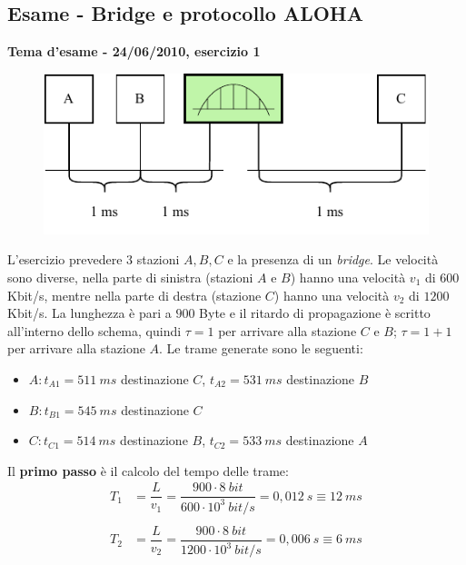 \documentclass[a4paper]{article}
\begin{document}
	\subsection{\textcolor{Red3}{Esame - Bridge e protocollo ALOHA}}
	
	\begin{center}
		\large
		\textcolor{Green4}{\textbf{Tema d'esame - 24/06/2010, esercizio 1}}
	\end{center}
	\begin{figure}[!htp]
		\centering
		\includegraphics[width=.7\textwidth]{img/ex2_bridge-ALOHA.pdf}
	\end{figure}

	\noindent
	L'esercizio prevedere $3$ stazioni $A,B,C$ e la presenza di un \emph{bridge}. Le velocità sono diverse, nella parte di sinistra (stazioni $A$ e $B$) hanno una velocità $v_{1}$ di $600$ Kbit/s, mentre nella parte di destra (stazione $C$) hanno una velocità $v_{2}$ di $1200$ Kbit/s. La lunghezza è pari a $900$ Byte e il ritardo di propagazione è scritto all'interno dello schema, quindi $\tau = 1$ per arrivare alla stazione $C$ e $B$; $\tau = 1 + 1$ per arrivare alla stazione $A$. Le trame generate sono le seguenti:
	\begin{itemize}[label=-]
		\item $A: t_{A1} = 511 \: ms$ destinazione $C$, $t_{A2} = 531 \: ms$ destinazione $B$
		\item $B: t_{B1} = 545 \: ms$ destinazione $C$
		\item $C: t_{C1} = 514 \: ms$ destinazione $B$, $t_{C2} = 533 \: ms$ destinazione $A$
	\end{itemize}
	Il \textbf{primo passo} è il calcolo del tempo delle trame:
	\begin{equation*}
		\begin{array}{ll}
			T_{1} &= \dfrac{L}{v_{1}} = \dfrac{900 \cdot 8 \: bit}{600 \cdot 10^{3} \: bit/s} = 0,012 \: s \equiv 12 \: ms \\
			& \\
			T_{2} &= \dfrac{L}{v_{2}} = \dfrac{900 \cdot 8 \: bit}{1200 \cdot 10^{3} \: bit/s} = 0,006 \: s \equiv 6 \: ms
		\end{array}
	\end{equation*}\newpage
\end{document}
